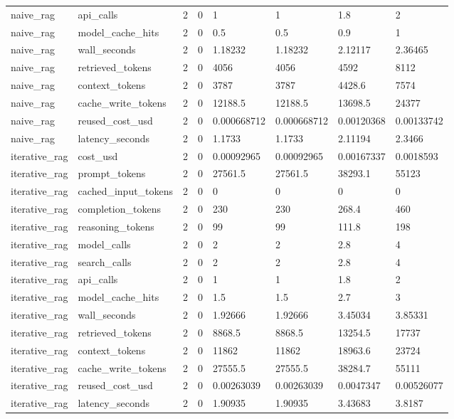 \begin{tabular}{llllllll}
naive\_rag & api\_calls & 2 & 0 & 1 & 1 & 1.8 & 2 \\
naive\_rag & model\_cache\_hits & 2 & 0 & 0.5 & 0.5 & 0.9 & 1 \\
naive\_rag & wall\_seconds & 2 & 0 & 1.18232 & 1.18232 & 2.12117 & 2.36465 \\
naive\_rag & retrieved\_tokens & 2 & 0 & 4056 & 4056 & 4592 & 8112 \\
naive\_rag & context\_tokens & 2 & 0 & 3787 & 3787 & 4428.6 & 7574 \\
naive\_rag & cache\_write\_tokens & 2 & 0 & 12188.5 & 12188.5 & 13698.5 & 24377 \\
naive\_rag & reused\_cost\_usd & 2 & 0 & 0.000668712 & 0.000668712 & 0.00120368 & 0.00133742 \\
naive\_rag & latency\_seconds & 2 & 0 & 1.1733 & 1.1733 & 2.11194 & 2.3466 \\
iterative\_rag & cost\_usd & 2 & 0 & 0.00092965 & 0.00092965 & 0.00167337 & 0.0018593 \\
iterative\_rag & prompt\_tokens & 2 & 0 & 27561.5 & 27561.5 & 38293.1 & 55123 \\
iterative\_rag & cached\_input\_tokens & 2 & 0 & 0 & 0 & 0 & 0 \\
iterative\_rag & completion\_tokens & 2 & 0 & 230 & 230 & 268.4 & 460 \\
iterative\_rag & reasoning\_tokens & 2 & 0 & 99 & 99 & 111.8 & 198 \\
iterative\_rag & model\_calls & 2 & 0 & 2 & 2 & 2.8 & 4 \\
iterative\_rag & search\_calls & 2 & 0 & 2 & 2 & 2.8 & 4 \\
iterative\_rag & api\_calls & 2 & 0 & 1 & 1 & 1.8 & 2 \\
iterative\_rag & model\_cache\_hits & 2 & 0 & 1.5 & 1.5 & 2.7 & 3 \\
iterative\_rag & wall\_seconds & 2 & 0 & 1.92666 & 1.92666 & 3.45034 & 3.85331 \\
iterative\_rag & retrieved\_tokens & 2 & 0 & 8868.5 & 8868.5 & 13254.5 & 17737 \\
iterative\_rag & context\_tokens & 2 & 0 & 11862 & 11862 & 18963.6 & 23724 \\
iterative\_rag & cache\_write\_tokens & 2 & 0 & 27555.5 & 27555.5 & 38284.7 & 55111 \\
iterative\_rag & reused\_cost\_usd & 2 & 0 & 0.00263039 & 0.00263039 & 0.0047347 & 0.00526077 \\
iterative\_rag & latency\_seconds & 2 & 0 & 1.90935 & 1.90935 & 3.43683 & 3.8187 \\

\end{tabular}
